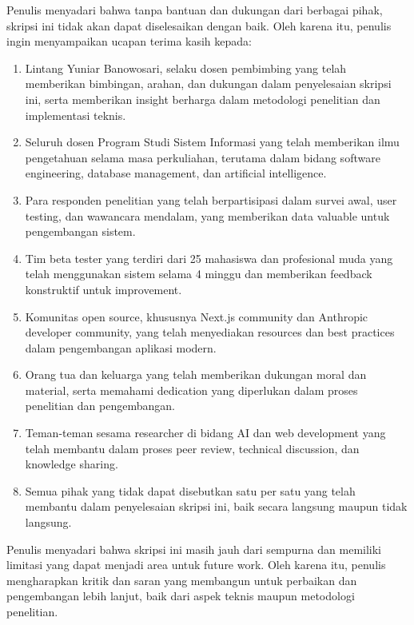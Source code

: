 \documentclass[12pt,a4paper,oneside]{report}
\begin{document}
Penulis menyadari bahwa tanpa bantuan dan dukungan dari berbagai pihak, skripsi ini tidak akan dapat diselesaikan dengan baik. Oleh karena itu, penulis ingin menyampaikan ucapan terima kasih kepada:

\begin{enumerate}
\item Lintang Yuniar Banowosari, selaku dosen pembimbing yang telah memberikan bimbingan, arahan, dan dukungan dalam penyelesaian skripsi ini, serta memberikan insight berharga dalam metodologi penelitian dan implementasi teknis.

\item Seluruh dosen Program Studi Sistem Informasi yang telah memberikan ilmu pengetahuan selama masa perkuliahan, terutama dalam bidang software engineering, database management, dan artificial intelligence.

\item Para responden penelitian yang telah berpartisipasi dalam survei awal, user testing, dan wawancara mendalam, yang memberikan data valuable untuk pengembangan sistem.

\item Tim beta tester yang terdiri dari 25 mahasiswa dan profesional muda yang telah menggunakan sistem selama 4 minggu dan memberikan feedback konstruktif untuk improvement.

\item Komunitas open source, khususnya Next.js community dan Anthropic developer community, yang telah menyediakan resources dan best practices dalam pengembangan aplikasi modern.

\item Orang tua dan keluarga yang telah memberikan dukungan moral dan material, serta memahami dedication yang diperlukan dalam proses penelitian dan pengembangan.

\item Teman-teman sesama researcher di bidang AI dan web development yang telah membantu dalam proses peer review, technical discussion, dan knowledge sharing.

\item Semua pihak yang tidak dapat disebutkan satu per satu yang telah membantu dalam penyelesaian skripsi ini, baik secara langsung maupun tidak langsung.
\end{enumerate}

Penulis menyadari bahwa skripsi ini masih jauh dari sempurna dan memiliki limitasi yang dapat menjadi area untuk future work. Oleh karena itu, penulis mengharapkan kritik dan saran yang membangun untuk perbaikan dan pengembangan lebih lanjut, baik dari aspek teknis maupun metodologi penelitian.
\end{document}
